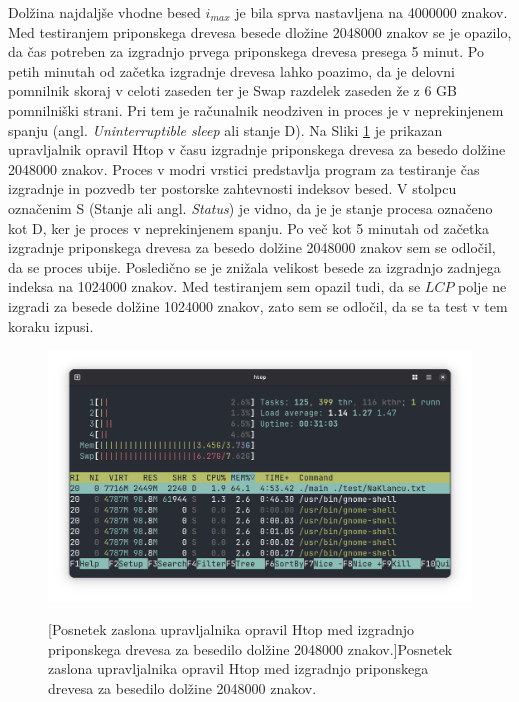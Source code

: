 Dolžina najdaljše vhodne besed $i_{max}$ je bila sprva nastavljena na 4000000 znakov. Med testiranjem priponskega drevesa besede dložine 2048000 znakov se je opazilo, da čas potreben za izgradnjo prvega priponskega drevesa presega 5 minut. Po petih minutah od začetka izgradnje drevesa lahko poazimo, da je delovni pomnilnik skoraj v celoti zaseden ter je Swap razdelek zaseden že z 6 GB pomnilniški strani. Pri tem je računalnik  neodziven in proces je v neprekinjenem spanju (angl. \textit{Uninterruptible sleep} ali stanje D). Na Sliki \ref{fig:6GB} je prikazan upravljalnik opravil Htop v času izgradnje priponskega drevesa za besedo dolžine 2048000 znakov. Proces v modri vrstici predstavlja program za testiranje čas izgradnje in pozvedb ter postorske zahtevnosti indeksov besed. V stolpcu označenim S (Stanje ali angl. \textit{Status}) je vidno, da je je stanje procesa označeno kot D, ker je proces v neprekinjenem spanju. Po več kot 5 minutah od začetka izgradnje priponskega drevesa za besedo dolžine 2048000 znakov sem se odločil, da se proces ubije. Posledično se je znižala velikost besede za izgradnjo zadnjega indeksa na 1024000 znakov. Med testiranjem sem opazil tudi, da se $LCP$ polje ne izgradi za besede dolžine 1024000 znakov, zato sem se odločil, da se ta test v tem koraku izpusi.

\begin{figure}[tb]
    \centering
    \includegraphics[width=\textwidth]{Slike/Zaslonski posnetek 2025-06-23 22-53-56.png}

    [Posnetek zaslona upravljalnika opravil Htop med izgradnjo priponskega drevesa za besedilo dolžine 2048000 znakov.]{Posnetek zaslona upravljalnika opravil Htop med izgradnjo priponskega drevesa za besedilo dolžine 2048000 znakov.} 
    \label{fig:6GB}
\end{figure}
\newpage


